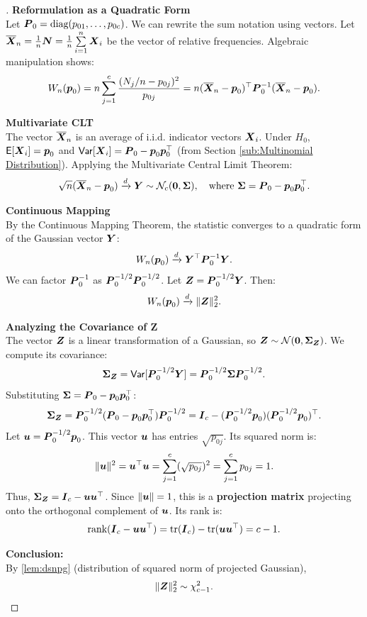 \begin{proof}[]
    \leavevmode
    \newline
\textbf{Reformulation as a Quadratic Form} \\
Let $\boldsymbol{P}_0 = \text{diag}(p_{01}, \dots, p_{0c})$. We can rewrite the sum notation using vectors. Let $\overline{\boldsymbol{X}}_n = \frac{1}{n} \boldsymbol{N} = \frac{1}{n} \sum\limits_{i=1}^n \boldsymbol{X}_i$ be the vector of relative frequencies.
Algebraic manipulation shows:
\[
    W_n(\boldsymbol{p}_0) = n \sum\limits_{j=1}^c \frac{(N_j/n - p_{0j})^2}{p_{0j}} = n(\overline{\boldsymbol{X}}_n - \boldsymbol{p}_0)^{\top} \boldsymbol{P}_0^{-1} (\overline{\boldsymbol{X}}_n - \boldsymbol{p}_0).
\]

\textbf{Multivariate CLT} \\
The vector $\overline{\boldsymbol{X}}_n$ is an average of i.i.d. indicator vectors $\boldsymbol{X}_i$. Under $H_0$, $\mathsf{E}[\boldsymbol{X}_i] = \boldsymbol{p}_0$ and $\mathsf{Var}[\boldsymbol{X}_i] = \boldsymbol{P}_0 - \boldsymbol{p}_0\boldsymbol{p}_0^\top$ (from Section \ref{sub:Multinomial Distribution}).
Applying the Multivariate Central Limit Theorem:
\[
    \sqrt{n}(\overline{\boldsymbol{X}}_n - \boldsymbol{p}_0) \xrightarrow{d} \boldsymbol{Y} \sim \mathcal{N}_c(\boldsymbol{0}, \boldsymbol{\Sigma}), \quad \text{where } \boldsymbol{\Sigma} = \boldsymbol{P}_0 - \boldsymbol{p}_0 \boldsymbol{p}_0^\top.
\]

\textbf{Continuous Mapping} \\
By the Continuous Mapping Theorem, the statistic converges to a quadratic form of the Gaussian vector $\boldsymbol{Y}$:
\[
    W_n(\boldsymbol{p}_0) \xrightarrow{d} \boldsymbol{Y}^{\top} \boldsymbol{P}_0^{-1} \boldsymbol{Y}.
\]
We can factor $\boldsymbol{P}_0^{-1}$ as $\boldsymbol{P}_0^{-1/2}\boldsymbol{P}_0^{-1/2}$. Let $\boldsymbol{Z} = \boldsymbol{P}_0^{-1/2} \boldsymbol{Y}$. Then:
\[
    W_n(\boldsymbol{p}_0) \xrightarrow{d} \|\boldsymbol{Z}\|_2^2.
\]

\textbf{Analyzing the Covariance of Z} \\
The vector $\boldsymbol{Z}$ is a linear transformation of a Gaussian, so $\boldsymbol{Z} \sim \mathcal{N}(\boldsymbol{0}, \boldsymbol{\Sigma}_{\boldsymbol{Z}})$. We compute its covariance:
\[
    \boldsymbol{\Sigma}_{\boldsymbol{Z}} = \mathsf{Var}[\boldsymbol{P}_0^{-1/2} \boldsymbol{Y}] = \boldsymbol{P}_0^{-1/2} \boldsymbol{\Sigma} \boldsymbol{P}_0^{-1/2}.
\]
Substituting $\boldsymbol{\Sigma} = \boldsymbol{P}_0 - \boldsymbol{p}_0\boldsymbol{p}_0^\top$:
\[
    \boldsymbol{\Sigma}_{\boldsymbol{Z}} = \boldsymbol{P}_0^{-1/2} (\boldsymbol{P}_0 - \boldsymbol{p}_0\boldsymbol{p}_0^\top) \boldsymbol{P}_0^{-1/2} = \boldsymbol{I}_c - (\boldsymbol{P}_0^{-1/2}\boldsymbol{p}_0)(\boldsymbol{P}_0^{-1/2}\boldsymbol{p}_0)^\top.
\]
Let $\boldsymbol{u} = \boldsymbol{P}_0^{-1/2}\boldsymbol{p}_0$. This vector $\boldsymbol{u}$ has entries $\sqrt{p_{0j}}$. Its squared norm is:
\[
    \|\boldsymbol{u}\|^2 = \boldsymbol{u}^\top \boldsymbol{u} = \sum\limits_{j=1}^c (\sqrt{p_{0j}})^2 = \sum\limits_{j=1}^c p_{0j} = 1.
\]
Thus, $\boldsymbol{\Sigma}_{\boldsymbol{Z}} = \boldsymbol{I}_c - \boldsymbol{u}\boldsymbol{u}^\top$. Since $\|\boldsymbol{u}\|=1$, this is a \textbf{projection matrix} projecting onto the orthogonal complement of $\boldsymbol{u}$. Its rank is:
\[
    \text{rank}(\boldsymbol{I}_c - \boldsymbol{u}\boldsymbol{u}^\top) = \text{tr}(\boldsymbol{I}_c) - \text{tr}(\boldsymbol{u}\boldsymbol{u}^\top) = c - 1.
\]

\textbf{Conclusion:} \\
By \autoref{lem:dsnpg} (distribution of squared norm of projected Gaussian),
\[
    \|\boldsymbol{Z}\|_2^2 \sim \chi_{c-1}^2.
\]
\end{proof}


